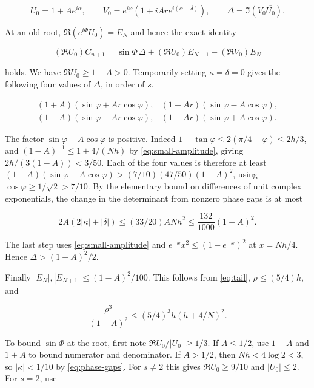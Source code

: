\documentclass[11pt]{article}
\begin{document}
\begin{equation*}
U_0=1+A e^{i\alpha},\qquad
V_0=e^{i\varphi}(1+iAr e^{i(\alpha+\delta)}),\qquad
\Delta=\Im(V_0\overline{U_0}) .
\end{equation*}

At an old root, $\Re(e^{i\Phi}U_0)=E_N$ and hence the exact identity

\begin{equation}
(\Re U_0) C_{n+1}=\sin\Phi\,\Delta+(\Re U_0)E_{N+1}-(\Re V_0)E_N
\label{eq:determinant}
\end{equation}

holds. We have $\Re U_0\ge1-A>0$. Temporarily setting $\kappa=\delta=0$ gives the following four values of $\Delta$, in order of $s$.

\begin{equation*}
\begin{array}{ll}
(1+A)(\sin\varphi+Ar\cos\varphi),&
(1-Ar)(\sin\varphi-A\cos\varphi),\\
(1-A)(\sin\varphi-Ar\cos\varphi),&
(1+Ar)(\sin\varphi+A\cos\varphi).
\end{array}
\end{equation*}

The factor $\sin\varphi-A\cos\varphi$ is positive. Indeed $1-\tan\varphi\le2(\pi/4-\varphi)\le2h/3$, and $(1-A)^{-1}\le1+4/(Nh)$ by \eqref{eq:small-amplitude}, giving $2h/(3(1-A))<3/50$. Each of the four values is therefore at least $(1-A)(\sin\varphi-A\cos\varphi)>(7/10)(47/50)(1-A)^2$, using $\cos\varphi\ge1/\sqrt2>7/10$. By the elementary bound on differences of unit complex exponentials, the change in the determinant from nonzero phase gaps is at most

\begin{equation*}
2A(2|\kappa|+|\delta|)\le (33/20)ANh^2\le\frac{132}{1000}(1-A)^2 .
\end{equation*}

The last step uses \eqref{eq:small-amplitude} and $e^{-x}x^2\le(1-e^{-x})^2$ at $x=Nh/4$. Hence $\Delta>(1-A)^2/2$.

Finally $|E_N|,|E_{N+1}|\le(1-A)^2/100$. This follows from \eqref{eq:tail}, $\rho\le(5/4)h$, and

\begin{equation*}
\frac{\rho^3}{(1-A)^2}\le(5/4)^3 h(h+4/N)^2 .
\end{equation*}

To bound $\sin\Phi$ at the root, first note $\Re U_0/|U_0|\ge1/3$. If $A\le1/2$, use $1-A$ and $1+A$ to bound numerator and denominator. If $A>1/2$, then $Nh<4\log 2<3$, so $|\kappa|<1/10$ by \eqref{eq:phase-gaps}. For $s\ne2$ this gives $\Re U_0\ge9/10$ and $|U_0|\le2$. For $s=2$, use
\end{document}
